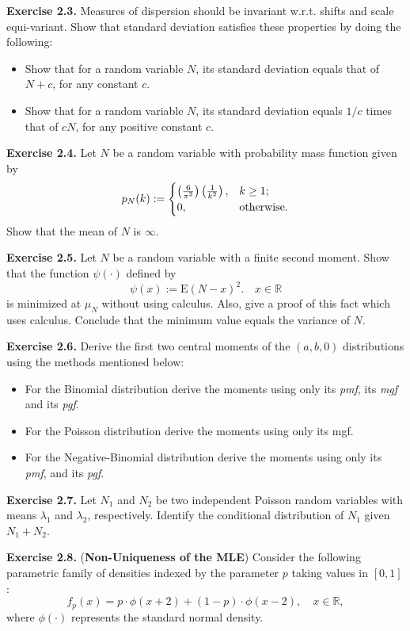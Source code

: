 \documentclass[]{book}
\providecommand{\tightlist}{%
  \setlength{\itemsep}{0pt}\setlength{\parskip}{0pt}}
\theoremstyle{definition}
\theoremstyle{definition}
\theoremstyle{definition}
\theoremstyle{remark}
\begin{document}
\textbf{Exercise 2.3.} Measures of dispersion should be invariant w.r.t.
shifts and scale equi-variant. Show that standard deviation satisfies
these properties by doing the following:

\begin{itemize}
\tightlist
\item
  Show that for a random variable \(N\), its standard deviation equals
  that of \(N+c\), for any constant \(c\).
\item
  Show that for a random variable \(N\), its standard deviation equals
  \(1/c\) times that of \(cN\), for any positive constant \(c\).
\end{itemize}

\textbf{Exercise 2.4.} Let \(N\) be a random variable with probability
mass function given by \[
p_N(k):= \begin{cases}
\left(\frac{6}{\pi^2}\right)\left(\frac{1}{k^{2}}\right), & k\geq 1;\\
0, &\hbox{otherwise}.
\end{cases}
\] Show that the mean of \(N\) is \(\infty\).

\textbf{Exercise 2.5.} Let \(N\) be a random variable with a finite
second moment. Show that the function \(\psi(\cdot)\) defined by \[
\psi(x):=\mathrm{E}{(N-x)^2}. \quad x\in\mathbb{R}
\] is minimized at \(\mu_N\) without using calculus. Also, give a proof
of this fact which uses calculus. Conclude that the minimum value equals
the variance of \(N\).

\textbf{Exercise 2.6.} Derive the first two central moments of the
\((a,b,0)\) distributions using the methods mentioned below:

\begin{itemize}
\tightlist
\item
  For the Binomial distribution derive the moments using only its
  \emph{pmf}, its \emph{mgf} and its \emph{pgf}.
\item
  For the Poisson distribution derive the moments using only its mgf.
\item
  For the Negative-Binomial distribution derive the moments using only
  its \emph{pmf}, and its \emph{pgf}.
\end{itemize}

\textbf{Exercise 2.7.} Let \(N_1\) and \(N_2\) be two independent
Poisson random variables with means \(\lambda_1\) and \(\lambda_2\),
respectively. Identify the conditional distribution of \(N_1\) given
\(N_1+N_2\).

\textbf{Exercise 2.8.} (\textbf{Non-Uniqueness of the MLE}) Consider the
following parametric family of densities indexed by the parameter \(p\)
taking values in \([0,1]\): \[
f_p(x)=p\cdot\phi(x+2)+(1-p)\cdot\phi(x-2), \quad x\in\mathbb{R},
\] where \(\phi(\cdot)\) represents the standard normal density.
\end{document}
